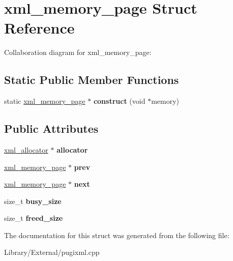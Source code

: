 \hypertarget{structxml__memory__page}{}\section{xml\+\_\+memory\+\_\+page Struct Reference}
\label{structxml__memory__page}


Collaboration diagram for xml\+\_\+memory\+\_\+page\+:
\subsection*{Static Public Member Functions}
\begin{DoxyCompactItemize}
\item 
\hypertarget{structxml__memory__page_ab425973f2abb4fa98ff077d88c0df11c}{}static \hyperlink{structxml__memory__page}{xml\+\_\+memory\+\_\+page} $\ast$ {\bfseries construct} (void $\ast$memory)\label{structxml__memory__page_ab425973f2abb4fa98ff077d88c0df11c}

\end{DoxyCompactItemize}
\subsection*{Public Attributes}
\begin{DoxyCompactItemize}
\item 
\hypertarget{structxml__memory__page_adf8fa143123a842baa59b82fc3d83c3b}{}\hyperlink{structxml__allocator}{xml\+\_\+allocator} $\ast$ {\bfseries allocator}\label{structxml__memory__page_adf8fa143123a842baa59b82fc3d83c3b}

\item 
\hypertarget{structxml__memory__page_a014969b0e4a34a6cb24e9823791e60ab}{}\hyperlink{structxml__memory__page}{xml\+\_\+memory\+\_\+page} $\ast$ {\bfseries prev}\label{structxml__memory__page_a014969b0e4a34a6cb24e9823791e60ab}

\item 
\hypertarget{structxml__memory__page_a326a74e009af80219ea31bc65ed9e45e}{}\hyperlink{structxml__memory__page}{xml\+\_\+memory\+\_\+page} $\ast$ {\bfseries next}\label{structxml__memory__page_a326a74e009af80219ea31bc65ed9e45e}

\item 
\hypertarget{structxml__memory__page_a04780ddabc14b45baba3d1ded79d355a}{}size\+\_\+t {\bfseries busy\+\_\+size}\label{structxml__memory__page_a04780ddabc14b45baba3d1ded79d355a}

\item 
\hypertarget{structxml__memory__page_ab4c29645546530a0e1938b53979890a8}{}size\+\_\+t {\bfseries freed\+\_\+size}\label{structxml__memory__page_ab4c29645546530a0e1938b53979890a8}

\end{DoxyCompactItemize}


The documentation for this struct was generated from the following file\+:\begin{DoxyCompactItemize}
\item 
Library/\+External/pugixml.\+cpp\end{DoxyCompactItemize}
